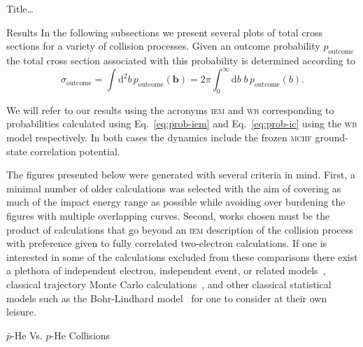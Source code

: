 \documentclass[letterpaper, 11 pt]{report}
\begin{document}
\begin{chapter}{ Title\dots \label{chap:p-he2p-he}}
\begin{section}{Results \label{sec:phe2p-res}}
      In the following subsections we present several plots of total cross sections for a variety of
      collision processes. Given an outcome probability $p_\mathrm{outcome}$ the total cross section
      associated with this probability is determined according to
      \begin{equation} \label{eq:tcs}
         \sigma_\mathrm{outcome} = \int \mathrm{d}^2 b \, p_\mathrm{outcome} (\mathbf{b})
         = 2 \pi \int^\infty_0 \mathrm{d}b \; b \, p_\mathrm{outcome} (b).
      \end{equation}
   
      We will refer to our results using the acronyms \textsc{iem} and \textsc{wb} corresponding to
      probabilities calculated using Eq.~\eqref{eq:prob-iem} and Eq.~\eqref{eq:prob-ic} using the
      \textsc{wb} model respectively. In both cases the dynamics include the frozen \textsc{mchf}
      ground-state correlation potential.

      The figures presented below were generated with several criteria in mind. First, a minimal number
      of older calculations was selected with the aim of covering as much of the impact energy range as
      possible while avoiding over burdening the figures with multiple overlapping curves. Second, works
      chosen must be the product of calculations that go beyond an \textsc{iem} description of the
      collision process with preference given to fully correlated two-electron calculations. If one is
      interested in some of the calculations excluded from these comparisons there exist a plethora of
      independent electron, independent event, or related models~\cite{SLD-83, DMR-84, SLD-85, GM-86,
      CM-87, GM-87, JLF-89, DC-90, DC-91a, DC-91b, DG-91, SKG-91, SL-91, Kuang-92, MLC-93, CM-94,
      CSR-95, BDM-96, MBGH-97, McCartney-97, Mccartney-99, GAMRF-02, GFS-02, AMRF-04, BLMC-04, FRBJG-06,
      FJG-07, GIFK-08, ZK-09, G-11, LFG-11, GG-12a}, classical trajectory Monte Carlo
      calculations~\cite{ZM-85, OWM-86, MO-87, WO-88, MS-89, Cohen-96, TH-96, MMTH-02, DAKW-04, GEP-09},
      and other classical statistical models such as the Bohr-Lindhard model~\cite{DYC-08,Ding-12} for
      one to consider at their own leisure.

      \begin{subsection}{ \texorpdfstring{$\bar{p}$}{pbar}-He Vs. \texorpdfstring{$p$}{p}-He Collisions
                         \label{sec:pbarhe-res}}


\end{subsection}
\end{section}
\end{chapter}
\end{document}
